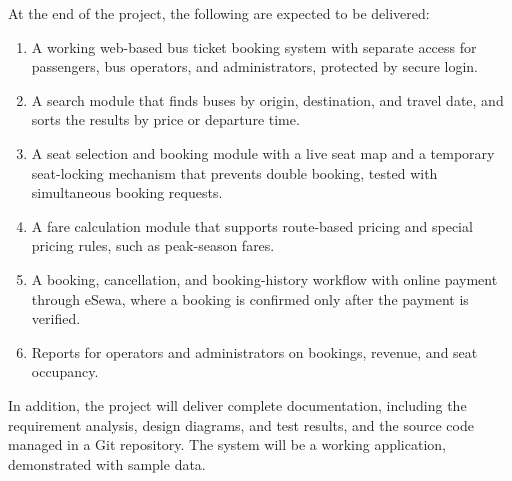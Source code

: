 
At the end of the project, the following are expected to be delivered:
\begin{enumerate}
	\item A working web-based bus ticket booking system with separate access for passengers, bus operators, and administrators, protected by secure login.
	\item A search module that finds buses by origin, destination, and travel date, and sorts the results by price or departure time.
	\item A seat selection and booking module with a live seat map and a temporary seat-locking mechanism that prevents double booking, tested with simultaneous booking requests.
	\item A fare calculation module that supports route-based pricing and special pricing rules, such as peak-season fares.
	\item A booking, cancellation, and booking-history workflow with online payment through eSewa, where a booking is confirmed only after the payment is verified.
	\item Reports for operators and administrators on bookings, revenue, and seat occupancy.
\end{enumerate}

In addition, the project will deliver complete documentation, including the requirement analysis, design diagrams, and test results, and the source code managed in a Git repository. The system will be a working application, demonstrated with sample data.